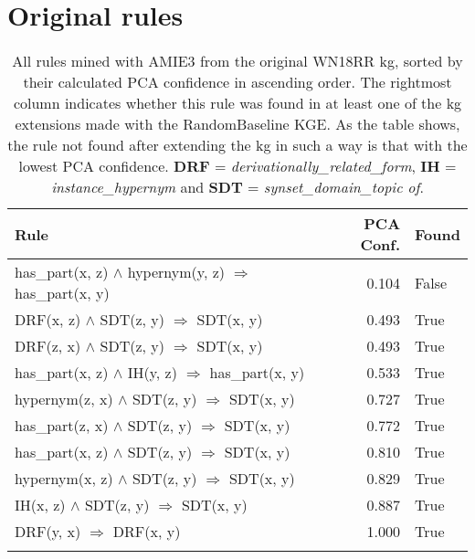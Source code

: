 \chapter{Original rules}
\begin{longtable}{lrl}
\toprule
                                                                                                      Rule &  PCA Conf. &  Found \\
\midrule
                                               has\_part(x, z) $\wedge$ hypernym(y, z)   $\Rightarrow$ has\_part(x, y) &           0.104 &                    False \\
DRF(x, z) $\wedge$ SDT(z, y)   $\Rightarrow$ SDT(x, y) &           0.493 &                     True \\
DRF(z, x) $\wedge$ SDT(z, y)   $\Rightarrow$ SDT(x, y) &           0.493 &                     True \\
                                      has\_part(x, z) $\wedge$ IH(y, z)   $\Rightarrow$ has\_part(x, y) &           0.533 &                     True \\
                   hypernym(z, x) $\wedge$ SDT(z, y)   $\Rightarrow$ SDT(x, y) &           0.727 &                     True \\
                   has\_part(z, x) $\wedge$ SDT(z, y)   $\Rightarrow$ SDT(x, y) &           0.772 &                     True \\
                   has\_part(x, z) $\wedge$ SDT(z, y)   $\Rightarrow$ SDT(x, y) &           0.810 &                     True \\
                   hypernym(x, z) $\wedge$ SDT(z, y)   $\Rightarrow$ SDT(x, y) &           0.829 &                     True \\
          IH(x, z) $\wedge$ SDT(z, y)   $\Rightarrow$ SDT(x, y) &           0.887 &                     True \\
                            DRF(y, x)   $\Rightarrow$ DRF(x, y) &           1.000 &                     True \\
\bottomrule
\caption[Original rules listed WN18RR KG]{All rules mined with AMIE3 from the original WN18RR \gls{kg}, sorted by their calculated PCA confidence in ascending order. The rightmost column indicates whether this rule was found in at least one of the \gls{kg} extensions made with the RandomBaseline KGE. As the table shows, the rule not found after extending the \gls{kg} in such a way is that with the lowest PCA confidence. \textbf{DRF} = \textit{derivationally\_related\_form}, \textbf{IH} = \textit{instance\_hypernym} and \textbf{SDT} = \textit{synset\_domain\_topic of}.}
\label{original_rules_found_by_baseline_WN18RR}
\end{longtable}

